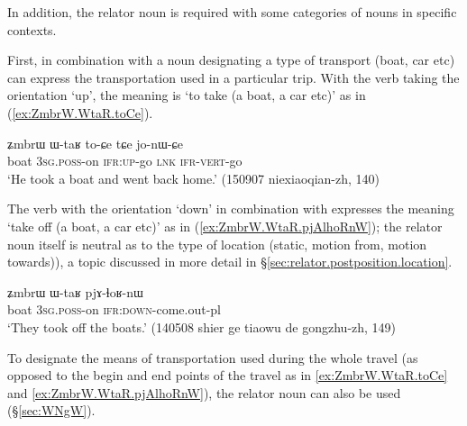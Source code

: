In addition, the relator noun  is required with some categories of nouns in specific contexts.

First,  in combination with a noun designating a type of transport (boat, car etc) can express the transportation used in a particular trip. With the verb  taking the orientation `up', the meaning is `to take (a boat, a car etc)' as in (\ref{ex:ZmbrW.WtaR.toCe}). 


\begin{exe}
\ex \label{ex:ZmbrW.WtaR.toCe}
\gll ʑmbrɯ ɯ-taʁ to-ɕe tɕe jo-nɯ-ɕe \\
boat \textsc{3sg}.\textsc{poss}-on \textsc{ifr}:\textsc{up}-go \textsc{lnk} \textsc{ifr}-\textsc{vert}-go \\
\glt `He took a boat and went back home.' (150907 niexiaoqian-zh, 140)
\end{exe} 

The verb  with the orientation `down' in combination with  expresses the meaning `take off (a boat, a car etc)' as in (\ref{ex:ZmbrW.WtaR.pjAlhoRnW}); the relator noun itself is neutral as to the type of location (static, motion from, motion towards)), a topic discussed in more detail in §\ref{sec:relator.postposition.location}.

\begin{exe}
\ex \label{ex:ZmbrW.WtaR.pjAlhoRnW}
\gll ʑmbrɯ ɯ-taʁ pjɤ-ɬoʁ-nɯ  \\
boat \textsc{3sg}.\textsc{poss}-on \textsc{ifr}:\textsc{down}-come.out-pl \\
\glt `They took off the boats.' (140508 shier ge tiaowu de gongzhu-zh, 149)
\end{exe} 

To designate the means of transportation used during the whole  travel (as opposed to the begin and end points of the travel as in \ref{ex:ZmbrW.WtaR.toCe} and \ref{ex:ZmbrW.WtaR.pjAlhoRnW}), the relator noun  can also be used (§\ref{sec:WNgW}).

